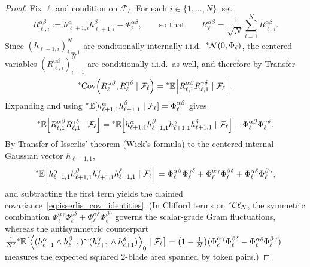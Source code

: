 \begin{proof}
Fix $\ell$ and condition on $\mathcal{F}_\ell$. For each $i \in \{1, \dots, N\}$, set
\begin{equation}\label{eq:single_neuron_R}
R_{\ell,i}^{\alpha\beta} := h_{\ell+1,i}^\alpha h_{\ell+1,i}^\beta - \Phi_\ell^{\alpha\beta}, \qquad \text{so that} \qquad R_\ell^{\alpha\beta} = \frac{1}{\sqrt{N}} \sum_{i=1}^N R_{\ell,i}^{\alpha\beta}.
\end{equation}
Since $(h_{\ell+1,i})_{i=1}^N$ are conditionally internally i.i.d.\ ${}^*\mathcal{N}(0, \Phi_\ell)$, the centered variables $(R_{\ell,i}^{\alpha\beta})_{i=1}^N$ are conditionally i.i.d.\ as well, and therefore by Transfer
\begin{equation}\label{eq:cov_reduce_i1}
{}^*\!\operatorname{Cov}\!\left(R_\ell^{\alpha\beta}, R_\ell^{\gamma\delta} \mid \mathcal{F}_\ell\right) = {}^*\mathbb{E}\!\left[R_{\ell,1}^{\alpha\beta} R_{\ell,1}^{\gamma\delta} \mid \mathcal{F}_\ell\right].
\end{equation}
Expanding and using ${}^*\mathbb{E}[h_{\ell+1,1}^\alpha h_{\ell+1,1}^\beta \mid \mathcal{F}_\ell] = \Phi_\ell^{\alpha\beta}$ gives
\begin{equation}\label{eq:fourth_moment_centered}
{}^*\mathbb{E}\!\left[R_{\ell,1}^{\alpha\beta} R_{\ell,1}^{\gamma\delta} \mid \mathcal{F}_\ell\right] = {}^*\mathbb{E}\!\left[h_{\ell+1,1}^\alpha h_{\ell+1,1}^\beta h_{\ell+1,1}^\gamma h_{\ell+1,1}^\delta \mid \mathcal{F}_\ell\right] - \Phi_\ell^{\alpha\beta}\Phi_\ell^{\gamma\delta}.
\end{equation}
By Transfer of Isserlis' theorem (Wick's formula) to the centered internal Gaussian vector $h_{\ell+1,1}$,
\begin{equation}\label{eq:wick_four_point}
{}^*\mathbb{E}\!\left[h_{\ell+1,1}^\alpha h_{\ell+1,1}^\beta h_{\ell+1,1}^\gamma h_{\ell+1,1}^\delta \mid \mathcal{F}_\ell\right] = \Phi_\ell^{\alpha\beta}\Phi_\ell^{\gamma\delta} + \Phi_\ell^{\alpha\gamma}\Phi_\ell^{\beta\delta} + \Phi_\ell^{\alpha\delta}\Phi_\ell^{\beta\gamma},
\end{equation}
and subtracting the first term yields the claimed covariance~\eqref{eq:isserlis_cov_identities}. (In Clifford terms on ${}^*\mathcal{C}\ell_N$, the symmetric combination $\Phi_\ell^{\alpha\gamma}\Phi_\ell^{\beta\delta} + \Phi_\ell^{\alpha\delta}\Phi_\ell^{\beta\gamma}$ governs the scalar-grade Gram fluctuations, whereas the antisymmetric counterpart $\frac{1}{N^2}{}^*\mathbb{E}\bigl[\left\langle (h_{\ell+1}^\alpha \wedge h_{\ell+1}^\beta)^{\sim}(h_{\ell+1}^\gamma \wedge h_{\ell+1}^\delta) \right\rangle_0 \mid \mathcal{F}_\ell\bigr] = \bigl(1 - \frac{1}{N}\bigr)(\Phi_\ell^{\alpha\gamma}\Phi_\ell^{\beta\delta} - \Phi_\ell^{\alpha\delta}\Phi_\ell^{\beta\gamma})$ measures the expected squared 2-blade area spanned by token pairs.)
\end{proof}

